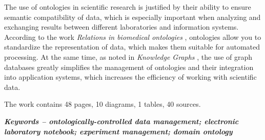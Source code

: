 The use of ontologies in scientific research is justified by their ability to ensure semantic compatibility of data, which is especially important when analyzing and exchanging results between different laboratories and information systems. According to the work \textit{Relations in biomedical ontologies} \cite{ontology:base1}, ontologies allow you to standardize the representation of data, which makes them suitable for automated processing. At the same time, as noted in \textit{Knowledge Graphs} \cite{ontology:base2}, the use of graph databases greatly simplifies the management of ontologies and their integration into application systems, which increases the efficiency of working with scientific data.

The work contains 48 pages, 10 diagrams, 1 tables, 40 sources.

\textit{\textbf{Keywords -- ontologically-controlled data management; electronic laboratory notebook; experiment management; domain ontology}}

